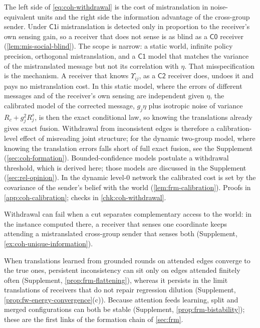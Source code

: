 The left side of \eqref{eq:coh-withdrawal} is the cost of mistranslation in noise-equivalent units and the right side the information advantage of the cross-group sender. Under $\mathsf{C1i}$ mistranslation is detected only in proportion to the receiver's own sensing gain, so a receiver that does not sense is as blind as a $\mathsf{C0}$ receiver (\cref{lem:mis-social-blind}). The scope is narrow: a static world, infinite policy precision, orthogonal mistranslation, and a $\mathsf{C1}$ model that matches the variance of the mistranslated message but not its correlation with $\eta$. That misspecification is the mechanism. A receiver that knows $\Upsilon_{ij}$, as a $\mathsf{C2}$ receiver does, undoes it and pays no mistranslation cost. In this static model, where the errors of different messages and of the receiver's own sensing are independent given $\eta$, the calibrated model of the corrected message, $g_j\eta$ plus isotropic noise of variance $R_c+g_j^2R^s_j$, is then the exact conditional law, so knowing the translations already gives exact fusion. Withdrawal from inconsistent edges is therefore a calibration-level effect of misreading joint structure; for the dynamic two-group model, where knowing the translation errors falls short of full exact fusion, see the Supplement (\cref{sec:coh-formation}). Bounded-confidence models postulate a withdrawal threshold, which is derived here; those models are discussed in the Supplement (\cref{sec:rel-opinion}). In the dynamic level-0 network the calibrated cost is set by the covariance of the sender's belief with the world (\cref{lem:frm-calibration}). Proofs in \cref{app:coh-calibration}; checks in \cref{chk:coh-withdrawal}.

Withdrawal can fail when a cut separates complementary access to the world: in the instance computed there, a receiver that senses one coordinate keeps attending a mistranslated cross-group sender that senses both (Supplement, \cref{ex:coh-unique-information}).

When translations learned from grounded rounds on attended edges converge to the true ones, persistent inconsistency can sit only on edges attended finitely often (Supplement, \cref{prop:frm-flattening}), whereas it persists in the limit translations of receivers that do not repair regression dilution (Supplement, \cref{prop:fw-energy-convergence}(c)). Because attention feeds learning, split and merged configurations can both be stable (Supplement, \cref{prop:frm-bistability}); these are the first links of the formation chain of \cref{sec:frm}.

